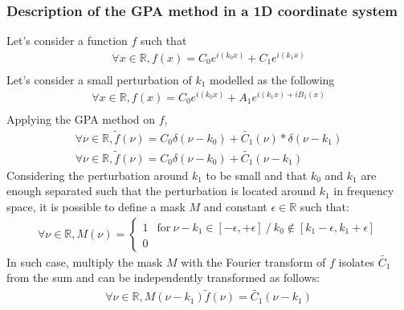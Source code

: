 \documentclass[12pt]{article}
\begin{document}
\subsubsection*{Description of the GPA method in a 1D coordinate system}
\noindent Let's consider a function $f$ such that 
\begin{equation*}
\begin{gathered}
\forall x \in \mathbb{R}, f(x)=C_0e^{i(k_0x)}+C_1e^{i(k_1x)} \\
\end{gathered}
\end{equation*}
Let's consider a small perturbation of $k_1$ modelled as the following
\begin{equation*}
\begin{gathered}
\forall x \in \mathbb{R}, f(x)=C_0e^{i(k_0x)}+A_1e^{i(k_1x)+iB_1(x)} \\
\end{gathered}
\end{equation*}
Applying the GPA method on $f$,
\begin{equation*}
\begin{gathered}
\forall \nu \in \mathbb{R}, 
\widetilde{f}(\nu)=C_0\delta(\nu-k_0)+\widetilde{C_1}(\nu)\ast\delta(\nu-k_1) \\
\forall \nu \in \mathbb{R}, 
\widetilde{f}(\nu)=C_0\delta(\nu-k_0)+\widetilde{C_1}(\nu-k_1)
\end{gathered}
\end{equation*}
Considering the perturbation around $k_1$ to be small and that $k_0$ and $k_1$ 
are enough separated such that the perturbation is located around $k_1$ in 
frequency space, it is possible to define a mask $M$ and constant $\epsilon \in 
\mathbb{R}$ such that:
\begin{equation*}
\begin{gathered}
\forall \nu \in \mathbb{R}, M(\nu) = 
\begin{cases}
1 & \text{for} \ \nu-k_1 \in  [-\epsilon,+\epsilon] \ / \ k_0 \notin 
[k_1-\epsilon,k_1+\epsilon] \\
0
\end{cases}
\end{gathered}
\end{equation*}
In such case, multiply the mask $M$ with the Fourier transform of $f$ isolates 
$\widetilde{C_1}$ from the sum and can be independently transformed as follows:
\begin{equation*}
\begin{gathered}
\forall \nu \in \mathbb{R}, 
M(\nu-k_1)\widetilde{f}(\nu)=\widetilde{C_1}(\nu-k_1)
\end{gathered}
\end{equation*}
\end{document}
